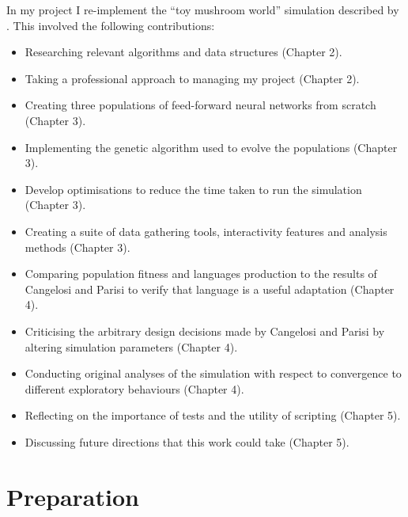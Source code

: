\documentclass[12pt,a4paper]{report}
\begin{document}
In my project I re-implement the ``toy mushroom world'' simulation described by \citet{Cangelosi1998}. This involved the following contributions:
\begin{itemize}
	\itemsep0em
	\item Researching relevant algorithms and data structures (Chapter 2).
	\item Taking a professional approach to managing my project (Chapter 2).
	\item Creating three populations of feed-forward neural networks from scratch (Chapter 3).
	\item Implementing the genetic algorithm used to evolve the populations (Chapter 3).
	\item Develop optimisations to reduce the time taken to run the simulation (Chapter 3).
	\item Creating a suite of data gathering tools, interactivity features and analysis methods (Chapter 3).
	\item Comparing population fitness and languages production to the results of Cangelosi and Parisi to verify that language is a useful adaptation (Chapter 4).
	\item Criticising the arbitrary design decisions made by Cangelosi and Parisi by altering simulation parameters (Chapter 4).
	\item Conducting original analyses of the simulation with respect to convergence to different exploratory behaviours (Chapter 4).
	\item Reflecting on the importance of tests and the utility of scripting (Chapter 5).
	\item Discussing future directions that this work could take (Chapter 5).
\end{itemize}


\chapter{Preparation}\label{chapter:preparation}
\end{document}
